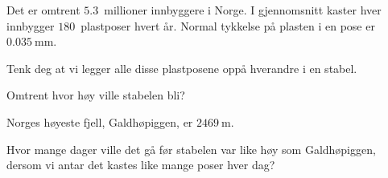 %


\Oppgave[3]

Det er omtrent $\num{5.3}$~millioner innbyggere i Norge. I gjennomsnitt kaster
hver innbygger $180$~plastposer hvert år. Normal tykkelse på plasten i en pose
er $\SI{0.035}{\milli\metre}$. \bigskip

Tenk deg at vi legger alle disse plastposene oppå hverandre i en stabel.

\begin{oppgaver}
   Omtrent hvor høy ville stabelen bli?
\end{oppgaver}

Norges høyeste fjell, Galdhøpiggen, er $\SI{2469}{\m}$.

\begin{oppgaver}
   Hvor mange dager ville det gå før stabelen var like høy som
  Galdhøpiggen, dersom vi antar det kastes like mange poser hver dag?
\end{oppgaver}


\Oppgave[4]


